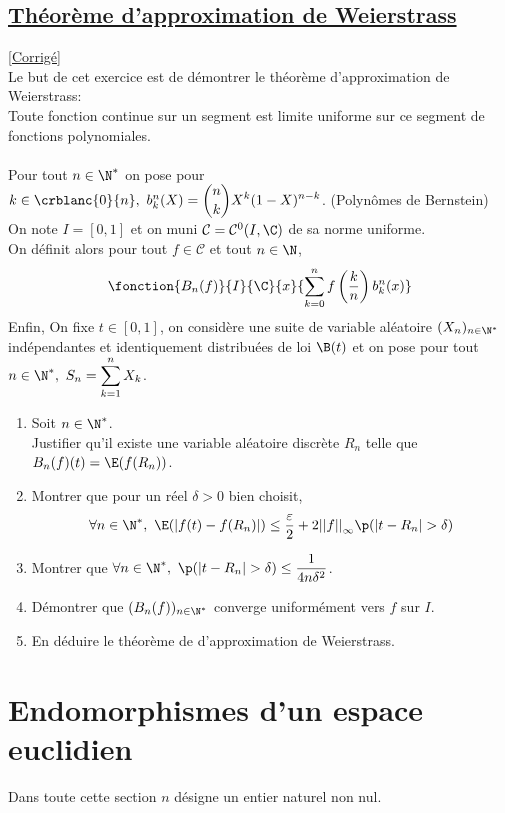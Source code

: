\documentclass[8pt]{book}
\begin{document}
\section{\underline{Théorème d'approximation de Weierstrass} }
\label{Théorème d'approximation de Weierstrass}
\textcolor{blue}{\hyperref[Théorème d'approximation de Weierstrass corrigé]{[Corrigé]}}\\
Le but de cet exercice est de démontrer le théorème d'approximation de Weierstrass:\\
Toute fonction continue sur un segment est limite uniforme sur ce segment de fonctions polynomiales.\\\\
Pour tout $n\in \N^*$ on pose pour $k\in \crblanc{0}{n},\ b_k^n(X)=\displaystyle\binom{n}{k}X^k(1-X)^{n-k}$. (Polynômes de Bernstein)\\
On note $I=[0,1]$ et on muni $\mathcal{C}=\mathcal{C}^0(I,\C)$ de sa norme uniforme.\\
On définit alors pour tout $f\in\mathcal{C}$ et tout $n\in \N$,
$$\fonction{B_n(f)}{I}{\C}{x}{\displaystyle\sum\limits_{k=0}^nf\left(\frac{k}{n}\right)b_k^n(x)}$$
Enfin, On fixe $t\in [0,1]$, on considère une suite de variable aléatoire $(X_n)_{n\in \N^*}$ indépendantes et identiquement distribuées de loi $\B(t)$ et on pose pour tout $n\in \N^*,\ S_n=\displaystyle\sum\limits_{k=1}^nX_k$.
\begin{enumerate}
	\item Soit $n\in \N^*$.\\
	Justifier qu'il existe une variable aléatoire discrète $R_n$ telle que $B_n(f)(t)=\E(f(R_n))$.
	\item Montrer que pour un réel $\delta>0$ bien choisit,
	$$\forall n\in \N^*,\ \E(|f(t)-f(R_n)|)\leq \displaystyle\frac{\varepsilon}{2}+2{||f||}_\infty\p(|t-R_n|>\delta)$$
	\item Montrer que $\forall n\in \N^*,\ \p(|t-R_n|>\delta)\leq \displaystyle\frac{1}{4n\delta^2}$.
	\item Démontrer que $(B_n(f))_{n\in \N^*}$ converge uniformément vers $f$ sur $I$.
	\item En déduire le théorème de d'approximation de Weierstrass.
\end{enumerate}

\chapter{Endomorphismes d'un espace euclidien}
Dans toute cette section $n$ désigne un entier naturel non nul.\\\\
\end{document}
